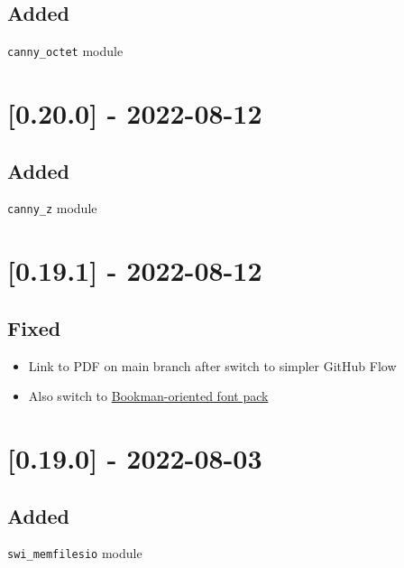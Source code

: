\subsection{Added}

\begin{shortlist}
    \item \verb$canny_octet$ module
\end{shortlist}

\section{[0.20.0] - 2022-08-12}

\subsection{Added}

\begin{shortlist}
    \item \verb$canny_z$ module
\end{shortlist}

\section{[0.19.1] - 2022-08-12}

\subsection{Fixed}

\begin{itemize}
    \item Link to PDF on main branch after switch to simpler GitHub Flow
    \item Also switch to \href{https://www.overleaf.com/learn/latex/Font_typefaces}{Bookman-oriented  font pack}
\end{itemize}

\section{[0.19.0] - 2022-08-03}

\subsection{Added}

\begin{shortlist}
    \item \verb$swi_memfilesio$ module
\end{shortlist}

